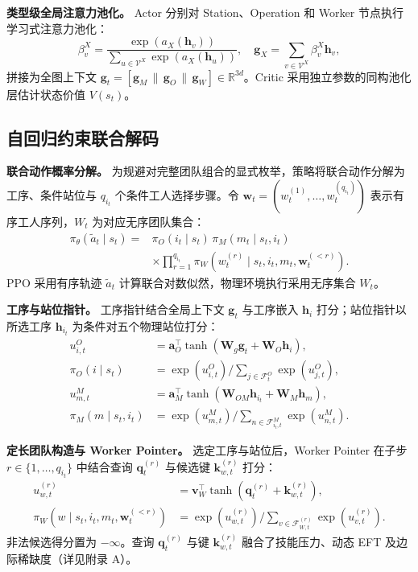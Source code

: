 \documentclass[journal,10pt]{IEEEtran}
\begin{document}
\textbf{类型级全局注意力池化。} Actor 分别对 Station、Operation 和 Worker 节点执行学习式注意力池化：
\begin{equation}
\beta_v^X = \frac{\exp(a_X(\mathbf h_v))}{\sum_{u\in\mathcal V^X}\exp(a_X(\mathbf h_u))}, \quad \mathbf g_X = \sum_{v\in\mathcal V^X}\beta_v^X\mathbf h_v,
\end{equation}
拼接为全图上下文 $\mathbf g_t = [\mathbf g_M \,\|\, \mathbf g_O \,\|\, \mathbf g_W] \in \mathbb R^{3d}$。Critic 采用独立参数的同构池化层估计状态价值 $V(s_t)$。

\subsection{自回归约束联合解码}\label{sec:decoder}

\textbf{联合动作概率分解。} 为规避对完整团队组合的显式枚举，策略将联合动作分解为工序、条件站位与 $q_{i_t}$ 个条件工人选择步骤。令 $\mathbf w_t=(w_t^{(1)},\dots,w_t^{(q_{i_t})})$ 表示有序工人序列，$W_t$ 为对应无序团队集合：
\begin{equation}
\begin{aligned}
\pi_\theta(\widetilde a_t\mid s_t) ={}& \pi_O(i_t\mid s_t)\,\pi_M(m_t\mid s_t,i_t) \\
&\times \prod_{r=1}^{q_{i_t}}\pi_W\left(w_t^{(r)}\mid s_t,i_t,m_t,\mathbf w_t^{(<r)}\right).
\end{aligned}
\end{equation}
PPO 采用有序轨迹 $\widetilde a_t$ 计算联合对数似然，物理环境执行采用无序集合 $W_t$。

\textbf{工序与站位指针。} 工序指针结合全局上下文 $\mathbf g_t$ 与工序嵌入 $\mathbf h_i$ 打分；站位指针以所选工序 $\mathbf h_{i_t}$ 为条件对五个物理站位打分：
\begin{align}
u_{i,t}^O &= \mathbf a_O^{\top}\tanh(\mathbf W_g\mathbf g_t + \mathbf W_O\mathbf h_i), \\
\pi_O(i\mid s_t) &= \exp(u_{i,t}^O)\Big/\textstyle\sum_{j\in\mathcal F_t^O}\exp(u_{j,t}^O), \\
u_{m,t}^M &= \mathbf a_M^{\top}\tanh(\mathbf W_{OM}\mathbf h_{i_t} + \mathbf W_M\mathbf h_m), \\
\pi_M(m\mid s_t,i_t) &= \exp(u_{m,t}^M)\Big/\textstyle\sum_{n\in\mathcal F_{i_t,t}^M}\exp(u_{n,t}^M).
\end{align}

\textbf{定长团队构造与 Worker Pointer。} 选定工序与站位后，Worker Pointer 在子步 $r\in\{1,\dots,q_{i_t}\}$ 中结合查询 $\mathbf q_t^{(r)}$ 与候选键 $\mathbf k_{w,t}^{(r)}$ 打分：
\begin{align}
u_{w,t}^{(r)} &= \mathbf v_W^{\top}\tanh\left(\mathbf q_t^{(r)} + \mathbf k_{w,t}^{(r)}\right), \\
\pi_W(w\mid s_t,i_t,m_t,\mathbf w_t^{(<r)}) &= \exp(u_{w,t}^{(r)})\Big/\textstyle\sum_{v\in\mathcal F_{W,t}^{(r)}}\exp(u_{v,t}^{(r)}).
\end{align}
非法候选得分置为 $-\infty$。查询 $\mathbf q_t^{(r)}$ 与键 $\mathbf k_{w,t}^{(r)}$ 融合了技能压力、动态 EFT 及边际稀缺度（详见附录 A）。
\end{document}
